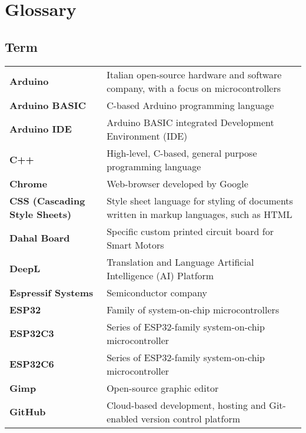 \newpage%
\clearpage%
\chapter*{Glossary}%
%
%
%

\section*{\hspace{0pt}Term \hspace{111pt}{Definition}}%
{\renewcommand{\arraystretch}{1.5} \renewcommand{\tabcolsep}{0.cm}
\begin{longtable}{>{\raggedright \bfseries}p{} p{}}
Arduino             & Italian open-source hardware and software company, with a focus on microcontrollers \\
Arduino BASIC       & C-based Arduino programming language \\
Arduino IDE         & Arduino BASIC integrated Development Environment (IDE) \\
C++                 & High-level, C-based, general purpose programming language \\
Chrome              & Web-browser developed by Google \\
CSS (Cascading Style Sheets)    & Style sheet language for styling of documents written in markup languages, such as HTML \\
Dahal Board         & Specific custom printed circuit board for Smart Motors \\
DeepL               & Translation and Language Artificial Intelligence (AI) Platform \\
Espressif Systems   & Semiconductor company \\
ESP32               & Family of system-on-chip microcontrollers \\
ESP32C3             & Series of ESP32-family system-on-chip microcontroller \\
ESP32C6             & Series of ESP32-family system-on-chip microcontroller \\
Gimp                & Open-source graphic editor \\
GitHub              & Cloud-based development, hosting and Git-enabled version control platform \\

\end{longtable}}
